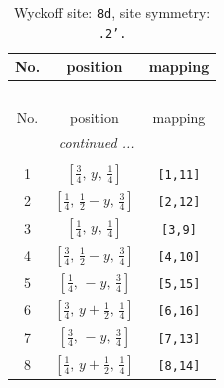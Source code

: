\documentclass[fleqn,8pt]{jsarticle}
\begin{document}
\begin{longtable}{ccc}
\caption{Wyckoff site: {\tt 8d}, site symmetry: {\tt .2'.}}
 \\
 \hline \hline
No. & position & mapping \\ \hline \endfirsthead

\multicolumn{2}{l}{\tablename\ \thetable{}} \\
 \hline \hline
No. & position & mapping \\ \hline \endhead

 \hline \hline
\multicolumn{2}{r}{\footnotesize\it continued ...} \\ \endfoot

 \hline \hline
\multicolumn{2}{r}{} \\ \endlastfoot

1 & $\left[ \frac{3}{4},\, y,\, \frac{1}{4} \right]$ & {\tt [1,11]} \\ \hline
2 & $\left[ \frac{1}{4},\, \frac{1}{2} - y,\, \frac{3}{4} \right]$ & {\tt [2,12]} \\ \hline
3 & $\left[ \frac{1}{4},\, y,\, \frac{1}{4} \right]$ & {\tt [3,9]} \\ \hline
4 & $\left[ \frac{3}{4},\, \frac{1}{2} - y,\, \frac{3}{4} \right]$ & {\tt [4,10]} \\ \hline
5 & $\left[ \frac{1}{4},\, - y,\, \frac{3}{4} \right]$ & {\tt [5,15]} \\ \hline
6 & $\left[ \frac{3}{4},\, y + \frac{1}{2},\, \frac{1}{4} \right]$ & {\tt [6,16]} \\ \hline
7 & $\left[ \frac{3}{4},\, - y,\, \frac{3}{4} \right]$ & {\tt [7,13]} \\ \hline
8 & $\left[ \frac{1}{4},\, y + \frac{1}{2},\, \frac{1}{4} \right]$ & {\tt [8,14]} \\
\end{longtable}
\renewcommand{\arraystretch}{1.2}
\end{document}
